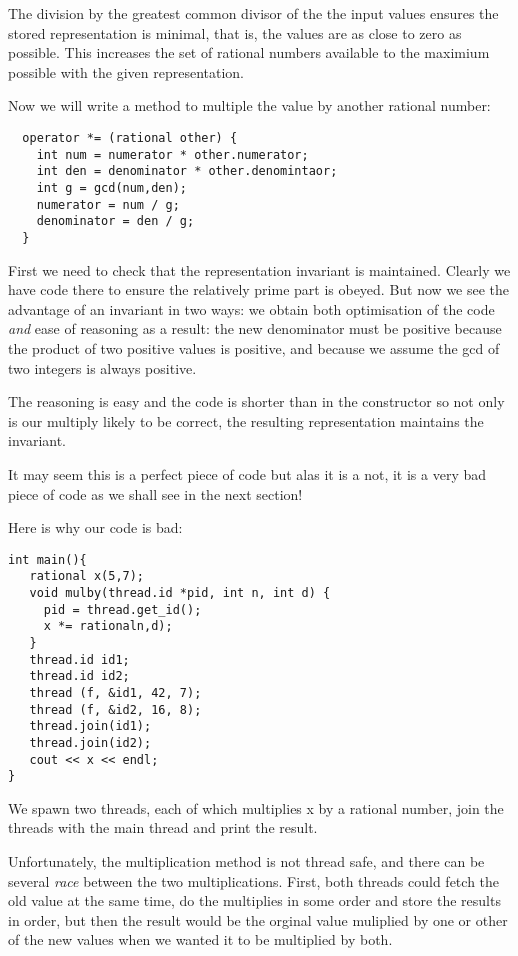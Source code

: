 \documentclass[oneside]{book}
\begin{document}
The division by the greatest common divisor of the the input
values ensures the stored representation is minimal, that is,
the values are as close to zero as possible. This increases the
set of rational numbers available to the maximium possible
with the given representation.

Now we will write a method to multiple the value by another rational
number:

\begin{verbatim}
  operator *= (rational other) { 
    int num = numerator * other.numerator;
    int den = denominator * other.denomintaor;
    int g = gcd(num,den);
    numerator = num / g;
    denominator = den / g;
  }
\end{verbatim}
First we need to check that the representation invariant is maintained.
Clearly we have code there to ensure the relatively prime part is obeyed.
But now we see the advantage of an invariant in two ways: we obtain
both optimisation of the code {\em and} ease of reasoning as a result:
the new denominator must be positive because the product of two positive
values is positive, and because we assume the gcd of two integers is always
positive.

The reasoning is easy and the code is shorter than in the constructor
so not only is our multiply likely to be correct, the resulting representation
maintains the invariant.

It may seem this is a perfect piece of code but alas it is a not,
it is a very bad piece of code as we shall see in the next section!

Here is why our code is bad:
\begin{verbatim}
int main(){
   rational x(5,7);
   void mulby(thread.id *pid, int n, int d) { 
     pid = thread.get_id(); 
     x *= rationaln,d);
   }
   thread.id id1;
   thread.id id2;
   thread (f, &id1, 42, 7);
   thread (f, &id2, 16, 8);
   thread.join(id1);
   thread.join(id2);
   cout << x << endl;
}
\end{verbatim}

We spawn two threads, each of which multiplies x by a rational number,
join the threads with the main thread and print the result.

Unfortunately, the multiplication method is not thread safe, and there
can be several {\em race} between the two multiplications. First,
both threads could fetch the old value at the same time, do the multiplies
in some order and store the results in order, but then the result would
be the orginal value muliplied by one or other of the new values when
we wanted it to be multiplied by both.
\end{document}
